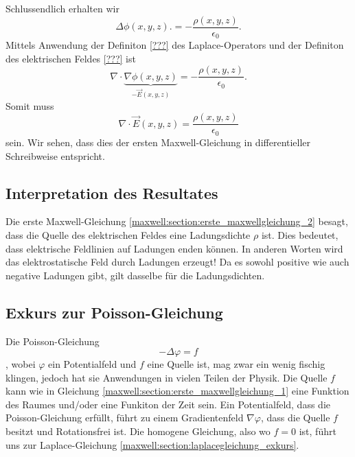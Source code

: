Schlussendlich erhalten wir
\begin{equation}
\Delta\phi(x,y,z).
=
-\frac{\rho(x,y,z)}{\epsilon_0}.
\label{maxwell:section:erste_maxwellgleichung_1}
\end{equation}
Mittels Anwendung der Definiton \ref{???} des Laplace-Operators und der Definiton des elektrischen Feldes \ref{???} ist
\[
\nabla\cdot\underbrace{\nabla\phi(x,y,z)}_{-\vec{E}(x,y,z)}
=
-\frac{\rho(x,y,z)}{\epsilon_0}.
\]
Somit muss
\begin{equation}
\nabla\cdot\vec{E}(x,y,z)
=
\frac{\rho(x,y,z)}{\epsilon_0}
\label{maxwell:section:erste_maxwellgleichung_2}
\end{equation}
sein.
Wir sehen, dass dies der ersten Maxwell-Gleichung in differentieller Schreibweise entspricht.

\subsection{Interpretation des Resultates}
Die erste Maxwell-Gleichung \eqref{maxwell:section:erste_maxwellgleichung_2} besagt, dass die Quelle des elektrischen Feldes eine Ladungsdichte $\rho$ ist.
Dies bedeutet, dass elektrische Feldlinien auf Ladungen enden können.
In anderen Worten wird das elektrostatische Feld durch Ladungen erzeugt!
Da es sowohl positive wie auch negative Ladungen gibt, gilt dasselbe für die Ladungsdichten.


\subsection{Exkurs zur Poisson-Gleichung}
Die Poisson-Gleichung
\[
-\Delta\varphi
=
f
\]
, wobei $\varphi$ ein Potentialfeld und $f$ eine Quelle ist, mag zwar ein wenig fischig klingen, jedoch hat sie Anwendungen in vielen Teilen der Physik.
Die Quelle $f$ kann wie in Gleichung \eqref{maxwell:section:erste_maxwellgleichung_1} eine Funktion des Raumes und/oder eine Funkiton der Zeit sein.
Ein Potentialfeld, dass die Poisson-Gleichung erfüllt, führt zu einem Gradientenfeld $\nabla\varphi$, dass die Quelle $f$ besitzt und Rotationsfrei ist.
Die homogene Gleichung, also wo $f = 0$ ist, führt uns zur Laplace-Gleichung \ref{maxwell:section:laplacegleichung_exkurs}.







